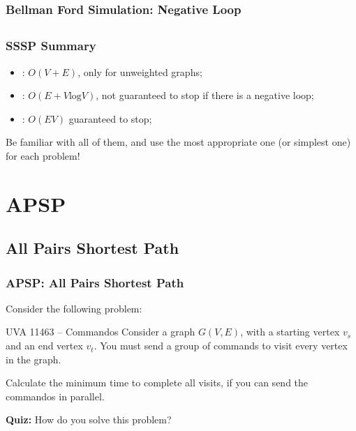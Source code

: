 \begin{frame}
  \frametitle{Bellman Ford Simulation: Negative Loop}
  \begin{center}
  \end{center}
  \vspace{10cm}
\end{frame}

\subsection{}
\begin{frame}
  \frametitle{SSSP Summary}
  \begin{itemize}
  \item {}: $O(V+E)$, only for unweighted graphs;\bigskip

  \item {}: $O(E+V\text{log}V)$, not guaranteed to stop if there is a negative loop;\bigskip

  \item {}: $O(EV)$ guaranteed to stop;
  \end{itemize}
  \bigskip

  Be familiar with all of them, and use the most appropriate one (or simplest one) for each problem!
\end{frame}


\section{APSP}
\subsection{All Pairs Shortest Path}
\begin{frame}
  \frametitle{APSP: All Pairs Shortest Path}

  Consider the following problem:

  \begin{block}{UVA 11463 -- Commandos}
    Consider a graph $G(V,E)$, with a starting vertex $v_s$ and an end vertex $v_t$. You must send a group of commands to visit every vertex in the graph.\bigskip

    Calculate the minimum time to complete all visits, if you can send the commandos in parallel.
  \end{block}

  {\bf Quiz:} How do you solve this problem?
\end{frame}


